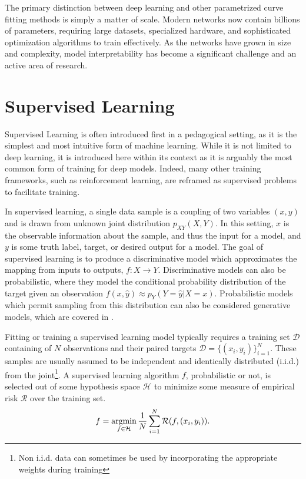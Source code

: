 The primary distinction between deep learning and other parametrized curve fitting methods is simply a matter of scale.
Modern networks now contain billions of parameters, requiring large datasets, specialized hardware, and sophisticated optimization algorithms to train effectively.
As the networks have grown in size and complexity, model interpretability has become a significant challenge and an active area of research.

\section{Supervised Learning}
\label{sec:supervised_learning}

Supervised Learning is often introduced first in a pedagogical setting, as it is the simplest and most intuitive form of machine learning. While it is not limited to deep learning, it is introduced here within its context as it is arguably the most common form of training for deep models. Indeed, many other training frameworks, such as reinforcement learning, are reframed as supervised problems to facilitate training.

In supervised learning, a single data sample is a coupling of two variables $(x, y)$ and is drawn from unknown joint distribution $p_{XY}(X, Y)$.
In this setting, $x$ is the observable information about the sample, and thus the input for a model, and $y$ is some truth label, target, or desired output for a model.
The goal of supervised learning is to produce a discriminative model which approximates the mapping from inputs to outputs, $f: X \rightarrow Y$.
Discriminative models can also be probabilistic, where they model the conditional probability distribution of the target given an observation $f(x, \hat y) \approx p_Y(Y=\hat y|X=x)$.
Probabilistic models which permit sampling from this distribution can also be considered generative models, which are covered in .

Fitting or training a supervised learning model typically requires a training set $\mathcal{D}$ containing of $N$ observations and their paired targets $\mathcal{D} = \{(x_i, y_i)\}_{i=1}^N$.
These samples are usually assumed to be independent and identically distributed (i.i.d.) from the joint\footnote{Non i.i.d. data can sometimes be used by incorporating the appropriate weights during training}.
A supervised learning algorithm $f$, probabilistic or not, is selected out of some hypothesis space $\mathcal{H}$ to minimize some measure of empirical risk $\mathcal{R}$ over the training set.
\begin{equation}
    f = \operatorname*{argmin}_{f \in \mathcal{H}} \frac{1}{N} \sum_{i=1}^N \mathcal{R}(f, (x_i, y_i)).
\end{equation}


